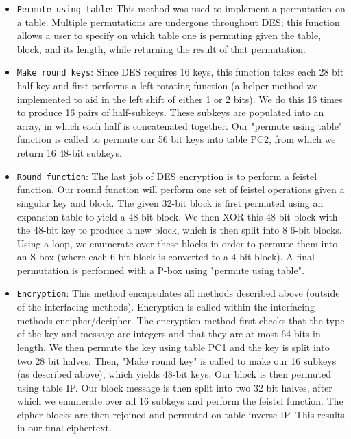 \documentclass[acmlarge]{acmart}
\begin{document}
\begin{itemize}
	\item \texttt{Permute using table}: This method was used to implement a permutation on a table. Multiple permutations are undergone throughout DES; this function allows a user to specify on which table one is permuting given the table, block, and its length, while returning the result of that permutation.
	\item \texttt{Make round keys}: Since DES requires 16 keys, this function takes each 28 bit half-key and first performs a left rotating function (a helper method we implemented to aid in the left shift of either 1 or 2 bits). We do this 16 times to produce 16 pairs of half-subkeys. These subkeys are populated into an array, in which each half is concatenated together. Our "permute using table" function is called to permute our 56 bit keys into table PC2, from which we return 16 48-bit subkeys.
	\item \texttt{Round function}: The last job of DES encryption is to perform a feistel function. Our round function will perform one set of feistel operations given a singular key and block. The given 32-bit block is first permuted using an expansion table to yield a 48-bit block. We then XOR this 48-bit block with the 48-bit key to produce a new block, which is then split into 8 6-bit blocks. Using a loop, we enumerate over these blocks in order to permute them into an S-box (where each 6-bit block is converted to a 4-bit block). A final permutation is performed with a P-box using "permute using table". 
	\item \texttt{Encryption}: This method encapsulates all methods described above (outside of the interfacing methods). Encryption is called within the interfacing methods encipher/decipher. The encryption method first checks that the type of the key and message are integers and that they are at most 64 bits in length. We then permute the key using table PC1 and the key is split into two 28 bit halves. Then, "Make round key" is called to make our 16 subkeys (as described above), which yields 48-bit keys. Our block is then permuted using table IP. Our block message is then split into two 32 bit halves, after which we enumerate over all 16 subkeys and perform the feistel function. The cipher-blocks are then rejoined and permuted on table inverse IP. This results in our final ciphertext. 
\end{itemize}
\end{document}

